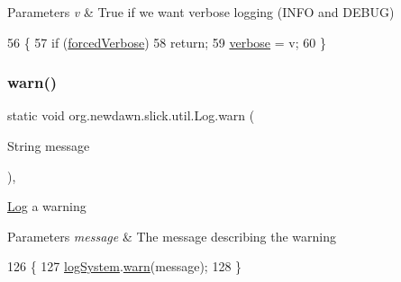 \begin{DoxyParams}{Parameters}
{\em v} & True if we want verbose logging (I\+N\+FO and D\+E\+B\+UG) \\
\hline
\end{DoxyParams}

\begin{DoxyCode}
56                                              \{
57         \textcolor{keywordflow}{if} (\mbox{\hyperlink{classorg_1_1newdawn_1_1slick_1_1util_1_1_log_ac5c775f540d68914085b57d8ac1868f8}{forcedVerbose}})
58             \textcolor{keywordflow}{return};
59         \mbox{\hyperlink{classorg_1_1newdawn_1_1slick_1_1util_1_1_log_af438e0ccf09b79bc870bd66fb9a02150}{verbose}} = v;
60     \}
\end{DoxyCode}
\mbox{\label{classorg_1_1newdawn_1_1slick_1_1util_1_1_log_af9e5027a42fc8dd4ec64812ae7da79ba}} 
\subsubsection{\texorpdfstring{warn()}{warn()}\hspace{0.1cm}{\footnotesize\ttfamily [1/2]}}
{\footnotesize\ttfamily static void org.\+newdawn.\+slick.\+util.\+Log.\+warn (\begin{DoxyParamCaption}\item[{String}]{message }\end{DoxyParamCaption})\hspace{0.3cm}{\ttfamily [inline]}, {\ttfamily [static]}}

\mbox{\hyperlink{classorg_1_1newdawn_1_1slick_1_1util_1_1_log}{Log}} a warning


\begin{DoxyParams}{Parameters}
{\em message} & The message describing the warning \\
\hline
\end{DoxyParams}

\begin{DoxyCode}
126                                             \{
127         \mbox{\hyperlink{classorg_1_1newdawn_1_1slick_1_1util_1_1_log_acca32268a2a183e671051b4b9188cc72}{logSystem}}.\mbox{\hyperlink{interfaceorg_1_1newdawn_1_1slick_1_1util_1_1_log_system_a4c4f5a96667389bbca64c86f63272b7d}{warn}}(message);
128     \}
\end{DoxyCode}
\mbox{\label{classorg_1_1newdawn_1_1slick_1_1util_1_1_log_a6cce7f2804423230c52de48c0e9c71d1}} 
